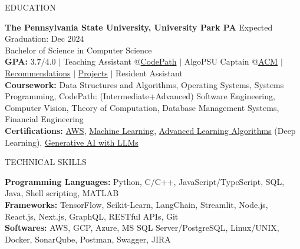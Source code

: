 \documentclass{resume} %
\begin{document}

\begin{rSection}{EDUCATION}

{\bf The Pennsylvania State University, University Park PA} \hfill {Expected Graduation: Dec $2024$}\\
{Bachelor of Science in Computer Science}\\
{\bf GPA:} $3.7/4.0$ $\vert$ Teaching Assistant @\href{https://www.codepath.org/en-us/volunteers/technical-interview-coaching}{CodePath} $\vert$ AlgoPSU Captain @\href{https://acm.psu.edu/algopsu/}{ACM} $\vert$ \href{https://www.linkedin.com/in/harshitjain17/details/recommendations/}{Recommendations} $\vert$ \href{https://www.linkedin.com/in/harshitjain17/details/projects/}{Projects} $\vert$ Resident Assistant \\
{\bf Coursework:} Data Structures and Algorithms, Operating Systems, Systems Programming, CodePath: (Intermediate+Advanced) Software Engineering, Computer Vision, Theory of Computation, Database Management Systems, Financial Engineering \\
{\bf Certifications:}  \href{https://www.coursera.org/account/accomplishments/verify/7L8L8YQTMCPZ}{AWS}, \href{https://www.coursera.org/account/accomplishments/verify/JYX5UB5YP4YD}{Machine Learning}, \href{https://www.coursera.org/account/accomplishments/records/PBF4QN2KQL4Z}{Advanced Learning Algorithms} (Deep Learning), \href{https://www.coursera.org/account/accomplishments/verify/3W6HA4ZC7UTY}{Generative AI with LLMs}
\end{rSection}


\begin{rSection}{TECHNICAL SKILLS}

{\bf Programming Languages:} Python, C/C++, JavaScript/TypeScript, SQL, Java, Shell scripting, MATLAB\\
{\bf Frameworks:} TensorFlow, Scikit-Learn, LangChain, Streamlit, Node.js, React.js, Next.js, GraphQL, RESTful APIs, Git\\
{\bf Softwares:} AWS, GCP, Azure, MS SQL Server/PostgreSQL, Linux/UNIX, Docker, SonarQube, Postman, Swagger, JIRA

\end{rSection}
\end{document}
